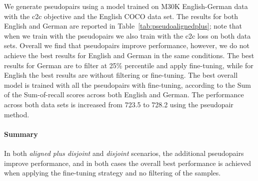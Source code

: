 We generate pseudopairs using a model trained on M30K English-German data with the c2c objective and the English
COCO data set. The results for both English and German are reported in Table~\ref{tab:pseudoalignedplus}; note that when we train with the pseudopairs we also train with the c2c loss on both data sets.  
Overall we find that pseudopairs 
improve performance, however, we do not achieve the 
best results for English and German in the same conditions. The best results for German are to filter at 25\% percentile and apply fine-tuning, 
while for English the best results are without filtering or fine-tuning. The best overall model is trained with
all the pseudopairs with fine-tuning, according to the Sum of the Sum-of-recall scores across 
both English and German.
The performance across both data sets is increased from 723.5 to 728.2 using the pseudopair method.

\paragraph{Summary}
In both \emph{aligned plus disjoint} and \emph{disjoint} scenarios, the 
additional pseudopairs improve performance, and in both cases the overall 
best performance is achieved when applying the 
fine-tuning strategy and no filtering of the samples.